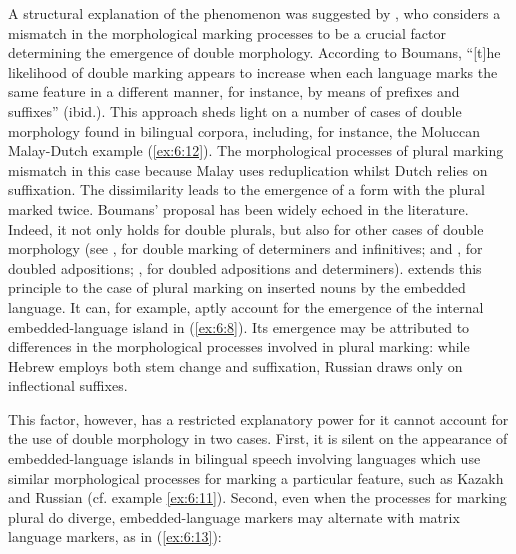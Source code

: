 A structural explanation of the phenomenon was suggested by \citet[][91]{boumans-syntax-1998}, who considers a mismatch in the morphological marking processes to be a crucial factor determining the emergence of double morphology. According to Boumans, ``[t]he likelihood of double marking appears to increase when each language marks the same feature in a different manner, for instance, by means of prefixes and suffixes'' (ibid.). This approach sheds light on a number of cases of double morphology found in bilingual corpora, including, for instance, the Moluccan Malay-Dutch example (\ref{ex:6:12}). The morphological processes of plural marking mismatch in this case because Malay uses reduplication whilst Dutch relies on suffixation. The dissimilarity leads to the emergence of a form with the plural marked twice. Boumans' proposal has been widely echoed in the literature. Indeed, it not only holds for double plurals, but also for other cases of double morphology (see \citealt[91]{myers-scotton-contact-2002}, for double marking of determiners and infinitives; \citealt[104]{muysken-bilingual-2000} and \citealt[152--156]{muhamedowa-untersuchung-2006}, for doubled adpositions; \citealt[346--352]{szabo-language-2010}, for doubled adpositions and determiners). \citet[150]{myers-scotton-contact-2002} extends this principle to the case of plural marking on inserted nouns by the embedded language. It can, for example, aptly account for the emergence of the internal embedded-language island in (\ref{ex:6:8}). Its emergence may be attributed to differences in the morphological processes involved in plural marking: while Hebrew employs both stem change and suffixation, Russian draws only on inflectional suffixes.

This factor, however, has a restricted explanatory power for it cannot account for the use of double morphology in two cases. First, it is silent on the appearance of embedded-language islands in bilingual speech involving languages which use similar morphological processes for marking a particular feature, such as Kazakh and Russian (cf. example \ref{ex:6:11}). Second, even when the processes for marking plural do diverge, embedded-language markers may alternate with matrix language markers, as in (\ref{ex:6:13}):

